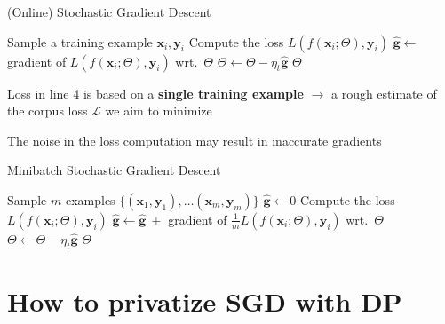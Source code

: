 \documentclass[12pt,aspectratio=169,handout]{beamer}
\begin{document}
\begin{frame}{(Online) Stochastic Gradient Descent}

\begin{algorithmic}[1]
		\State Sample a training example $\bm{x}_i, \bm{y}_i$
		\State Compute the loss $L(f(\bm{x}_i; \Theta), \bm{y}_i)$
		\State $\hat{\bm{g}} \gets$ gradient of $L(f(\bm{x}_i; \Theta), \bm{y}_i)$ wrt.\ $\Theta$
		\State $\Theta \gets \Theta - \eta_t \hat{\bm{g}}$
	\EndWhile
	\State \Return $\Theta$
	\EndFunction
\end{algorithmic}

Loss in line 4 is based on a \textbf{single training example} $\to$ a rough estimate of the corpus loss $\mathcal{L}$ we aim to minimize

The noise in the loss computation may result in inaccurate gradients

\end{frame}


\begin{frame}{Minibatch Stochastic Gradient Descent}
	
	\begin{algorithmic}[1]
		\State Sample $m$ examples $\{ (\bm{x}_1, \bm{y}_1), \ldots (\bm{x}_m, \bm{y}_m) \}$
		\State $\hat{\bm{g}} \gets 0$
			\State Compute the loss $L(f(\bm{x}_i; \Theta), \bm{y}_i)$
			\State $\hat{\bm{g}} \gets \hat{\bm{g}}\ + $ gradient of $\frac{1}{m} L(f(\bm{x}_i; \Theta), \bm{y}_i)$ wrt.\ $\Theta$
		\EndFor
		\State $\Theta \gets \Theta - \eta_t \hat{\bm{g}}$
		\EndWhile
		\State \Return $\Theta$
		\EndFunction
	\end{algorithmic}
	

\end{frame}




\section{How to privatize SGD with DP}
\end{document}
